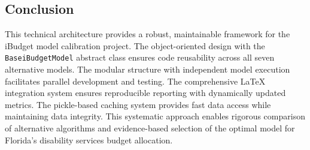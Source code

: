 \subsection{Conclusion}

This technical architecture provides a robust, maintainable framework for the iBudget model calibration project. The object-oriented design with the \texttt{BaseiBudgetModel} abstract class ensures code reusability across all seven alternative models. The modular structure with independent model execution facilitates parallel development and testing. The comprehensive LaTeX integration system ensures reproducible reporting with dynamically updated metrics. The pickle-based caching system provides fast data access while maintaining data integrity. This systematic approach enables rigorous comparison of alternative algorithms and evidence-based selection of the optimal model for Florida's disability services budget allocation.


% 



% 
% 


